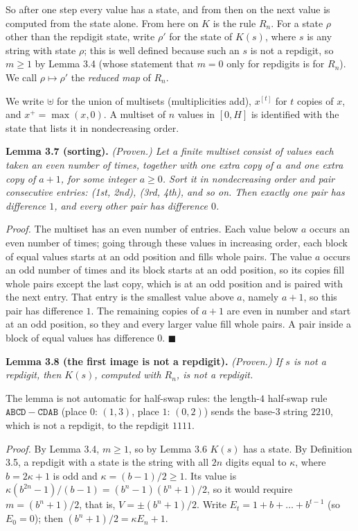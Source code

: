 \documentclass[11pt,letterpaper]{article}
\theoremstyle{paperstyle}
\theoremstyle{paperstyledef}
\theoremstyle{paperstylerem}
\begin{document}
So after one step every value has a state, and from then on the next value is computed from the state alone. From here on \(K\) is the rule \(R_n\). For a state \(\rho\) other than the repdigit state, write \(\rho'\) for the state of \(K(s)\), where \(s\) is any string with state \(\rho\); this is well defined because such an \(s\) is not a repdigit, so \(m \geq 1\) by Lemma 3.4 (whose statement that \(m = 0\) only for repdigits is for \(R_n\)). We call \(\rho \mapsto \rho'\) the \emph{reduced map} of \(R_n\).

We write \(\uplus\) for the union of multisets (multiplicities add), \(x^{[t]}\) for \(t\) copies of \(x\), and \(x^+ = \max(x, 0)\). A multiset of \(n\) values in \([0, H]\) is identified with the state that lists it in nondecreasing order.

\textbf{Lemma 3.7 (sorting).} \emph{(Proven.) Let a finite multiset consist of values each taken an even number of times, together with one extra copy of \(a\) and one extra copy of \(a+1\), for some integer \(a \geq 0\). Sort it in nondecreasing order and pair consecutive entries: (1st, 2nd), (3rd, 4th), and so on. Then exactly one pair has difference \(1\), and every other pair has difference \(0\).}

\emph{Proof.} The multiset has an even number of entries. Each value below \(a\) occurs an even number of times; going through these values in increasing order, each block of equal values starts at an odd position and fills whole pairs. The value \(a\) occurs an odd number of times and its block starts at an odd position, so its copies fill whole pairs except the last copy, which is at an odd position and is paired with the next entry. That entry is the smallest value above \(a\), namely \(a + 1\), so this pair has difference \(1\). The remaining copies of \(a+1\) are even in number and start at an odd position, so they and every larger value fill whole pairs. A pair inside a block of equal values has difference \(0\). \(\blacksquare\)

\textbf{Lemma 3.8 (the first image is not a repdigit).} \emph{(Proven.) If \(s\) is not a repdigit, then \(K(s)\), computed with \(R_n\), is not a repdigit.}

The lemma is not automatic for half-swap rules: the length-\(4\) half-swap rule \(\mathtt{ABCD} - \mathtt{CDAB}\) (place \(0\): \((1, 3)\), place \(1\): \((0, 2)\)) sends the base-\(3\) string \(2210\), which is not a repdigit, to the repdigit \(1111\).

\emph{Proof.} By Lemma 3.4, \(m \geq 1\), so by Lemma 3.6 \(K(s)\) has a state. By Definition 3.5, a repdigit with a state is the string with all \(2n\) digits equal to \(\kappa\), where \(b = 2\kappa + 1\) is odd and \(\kappa = (b-1)/2 \geq 1\). Its value is \(\kappa(b^{2n} - 1)/(b-1) = (b^n - 1)(b^n + 1)/2\), so it would require \(m = (b^n + 1)/2\), that is, \(V = \pm (b^n + 1)/2\). Write \(E_t = 1 + b + \dots + b^{t-1}\) (so \(E_0 = 0\)); then \((b^n + 1)/2 = \kappa E_n + 1\).
\end{document}
